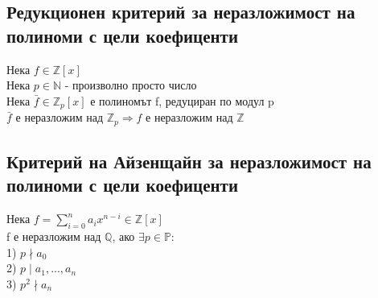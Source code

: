 \documentclass[12pt]{article}
\begin{document}
\subsection{Редукционен критерий за неразложимост на полиноми с цели коефиценти}
Нека $f \in \mathbb{Z}[x]$ \\
Нека $p \in \mathbb{N}$ - произволно просто число \\
Нека $\bar{f} \in \mathbb{Z}_p[x]$ е полиномът f, редуциран по модул p \\
$\bar{f}$ е неразложим над $\mathbb{Z}_p \Rightarrow f$ е неразложим над $\mathbb{Z}$

\subsection{Критерий на Айзенщайн за неразложимост на полиноми с цели коефиценти}
Нека $f = \sum\limits_{i=0}^{n}a_ix^{n-i} \in \mathbb{Z}[x]$ \\
f е неразложим над $\mathbb{Q}$, ако $\exists p \in \mathbb{P}: $\\
1) $p \nmid a_0$ \\
2) $p \mid a_1, ..., a_n$ \\
3) $p^2 \nmid a_n$
\end{document}
